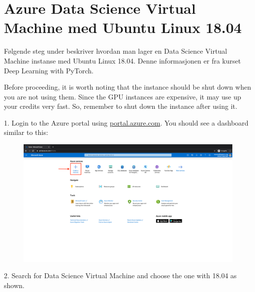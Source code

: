 \clearpage
{}
\setcounter{page}{1}


\section{Azure Data Science Virtual Machine med Ubuntu Linux 18.04}
\label{appendix:azure}

Følgende steg under beskriver hvordan man lager en Data Science Virtual Machine instanse med Ubuntu Linux 18.04. Denne informasjonen er fra 	kurset Deep Learning with PyTorch. \cite{Mallick m.fl. 2020}

Before proceeding, it is worth noting that the instance should be shut down when you are not using them. Since the GPU instances are expensive, it may use up your credits very fast. So, remember to shut down the instance after using it.

1. Login to the Azure portal using \url{portal.azure.com}. You should see a dashboard similar to this:

\begin{figure}[H]
\begin{center} 
\includegraphics[scale=0.20]{figures/vm1}
\end{center}
\end{figure}

2. Search for Data Science Virtual Machine and choose the one with 18.04 as shown.

